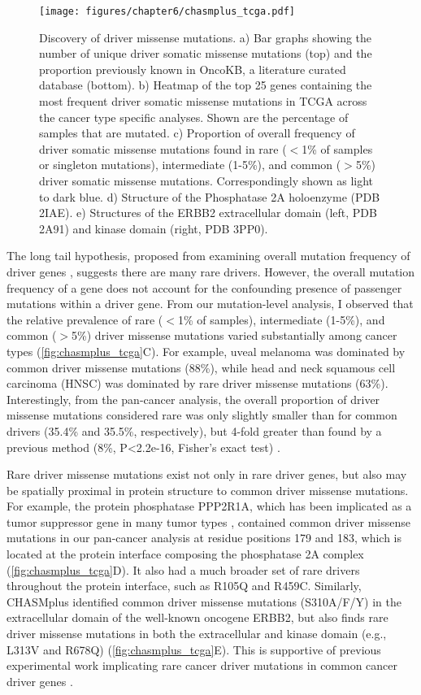 \begin{figure}
  \centering
  \makeatletter
  \let\@currsize\normalsize
  \texttt{[image: figures/chapter6/chasmplus\_tcga.pdf]}
  \caption[Discovery of driver missense mutations by CHASMplus]{Discovery of driver missense mutations. a) Bar graphs showing the number of unique driver somatic missense mutations (top) and the proportion previously known in OncoKB, a literature curated database (bottom). b) Heatmap of the top 25 genes containing the most frequent driver somatic missense mutations in TCGA across the cancer type specific analyses. Shown are the percentage of samples that are mutated. c) Proportion of overall frequency of driver somatic missense mutations found in rare ($<$1\% of samples or singleton mutations), intermediate (1-5\%), and common ($>$5\%) driver somatic missense mutations. Correspondingly shown as light to dark blue. d) Structure of the Phosphatase 2A holoenzyme (PDB 2IAE). e) Structures of the ERBB2 extracellular domain (left, PDB 2A91) and kinase domain (right, PDB 3PP0).}
  \label{fig:chasmplus_tcga}
\end{figure}

The long tail hypothesis, proposed from examining overall mutation frequency of driver genes \cite{RN147, RN148}, suggests there are many rare drivers. However, the overall mutation frequency of a gene does not account for the confounding presence of passenger mutations within a driver gene. From our mutation-level analysis, I observed that the relative prevalence of rare ($<$1\% of samples), intermediate (1-5\%), and common ($>$5\%) driver missense mutations varied substantially among cancer types (\autoref{fig:chasmplus_tcga}C). For example, uveal melanoma was dominated by common driver missense mutations (88\%), while head and neck squamous cell carcinoma (HNSC) was dominated by rare driver missense mutations (63\%). Interestingly, from the pan-cancer analysis, the overall proportion of driver missense mutations considered rare was only slightly smaller than for common drivers (35.4\% and 35.5\%, respectively), but 4-fold greater than found by a previous method (8\%, P<2.2e-16, Fisher’s exact test) \cite{RN23}.

Rare driver missense mutations exist not only in rare driver genes, but also may be spatially proximal in protein structure to common driver missense mutations. For example, the protein phosphatase PPP2R1A, which has been implicated as a tumor suppressor gene in many tumor types \cite{RN57}, contained common driver missense mutations in our pan-cancer analysis at residue positions 179 and 183, which is located at the protein interface composing the phosphatase 2A complex (\autoref{fig:chasmplus_tcga}D). It also had a much broader set of rare drivers throughout the protein interface, such as R105Q and R459C.  Similarly, CHASMplus identified common driver missense mutations (S310A/F/Y) in the extracellular domain of the well-known oncogene ERBB2, but also finds rare driver missense mutations in both the extracellular and kinase domain (e.g., L313V and R678Q) (\autoref{fig:chasmplus_tcga}E). This is supportive of previous experimental work implicating rare cancer driver mutations in common cancer driver genes \cite{RN4}.

